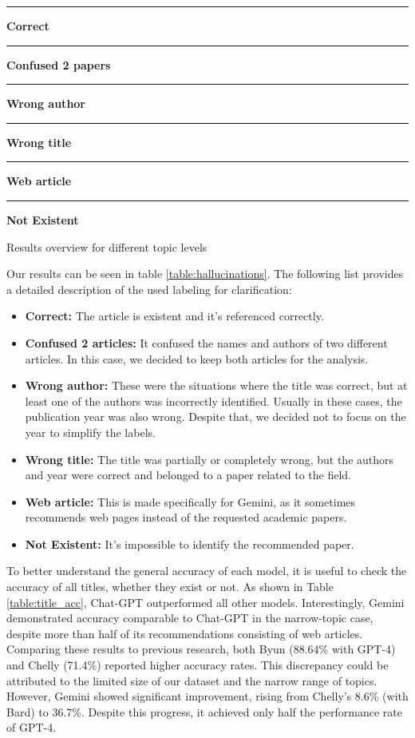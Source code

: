 \documentclass[runningheads]{llncs}
\begin{document}
\begin{table}[!ht]
\parbox{\textwidth}{
    \centering
    \textcolor{green}{\rule{10pt}{10pt}} \textbf{Correct} \quad
    \textcolor{blue}{\rule{10pt}{10pt}} \textbf{Confused 2 papers} \quad
    \textcolor{orange}{\rule{10pt}{10pt}} \textbf{Wrong author} \quad
    \\
    \textcolor{yellow}{\rule{10pt}{10pt}} \textbf{Wrong title} \quad
    \textcolor{pink}{\rule{10pt}{10pt}} \textbf{Web article} \quad
    \textcolor{red}{\rule{10pt}{10pt}} \textbf{Not Existent}
}
\caption{Results overview for different topic levels}
\label{table:hallucinations}
\end{table}

Our results can be seen in table \ref{table:hallucinations}. The following list provides a detailed description of the used labeling for clarification:

\begin{itemize}
    \item \textbf{Correct:} The article is existent and it's referenced correctly.
    \item \textbf{Confused 2 articles:} It confused the names and authors of two different articles. In this case, we decided to keep both articles for the analysis.
    \item \textbf{Wrong author:} These were the situations where the title was correct, but at least one of the authors was incorrectly identified. Usually in these cases, the publication year was also wrong. Despite that, we decided not to focus on the year to simplify the labels.
    \item \textbf{Wrong title:} The title was partially or completely wrong, but the authors and year were correct and belonged to a paper related to the field.
    \item \textbf{Web article:} This is made specifically for Gemini, as it sometimes recommends web pages instead of the requested academic papers.
    \item \textbf{Not Existent:} It's impossible to identify the recommended paper.
\end{itemize}

To better understand the general accuracy of each model, it is useful to check the accuracy of all titles, whether they exist or not. As shown in Table \ref{table:title_acc}, Chat-GPT outperformed all other models. Interestingly, Gemini demonstrated accuracy comparable to Chat-GPT in the narrow-topic case, despite more than half of its recommendations consisting of web articles. Comparing these results to previous research, both Byun (88.64\% with GPT-4) and Chelly (71.4\%) reported higher accuracy rates. This discrepancy could be attributed to the limited size of our dataset and the narrow range of topics. However, Gemini showed significant improvement, rising from Chelly's 8.6\% (with Bard) to 36.7\%. Despite this progress, it achieved only half the performance rate of GPT-4.
\end{document}
